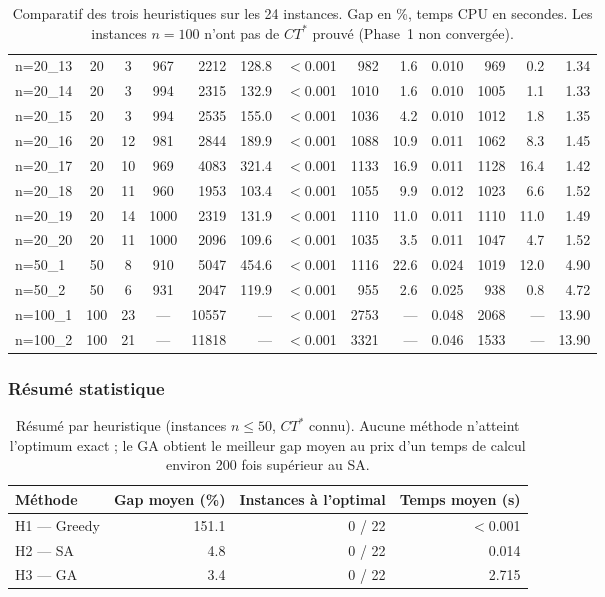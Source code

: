 \documentclass{article}
\begin{document}
\begin{table}[h!]
\begin{tabular}{l c c c | r r r | r r r | r r r}
n=20\_13 & 20 &  3 &  967 & 2212 & 128.8 & $<$0.001 &  982 &  1.6 & 0.010 &  969 &  0.2 & 1.34 \\
n=20\_14 & 20 &  3 &  994 & 2315 & 132.9 & $<$0.001 & 1010 &  1.6 & 0.010 & 1005 &  1.1 & 1.33 \\
n=20\_15 & 20 &  3 &  994 & 2535 & 155.0 & $<$0.001 & 1036 &  4.2 & 0.010 & 1012 &  1.8 & 1.35 \\
n=20\_16 & 20 & 12 &  981 & 2844 & 189.9 & $<$0.001 & 1088 & 10.9 & 0.011 & 1062 &  8.3 & 1.45 \\
n=20\_17 & 20 & 10 &  969 & 4083 & 321.4 & $<$0.001 & 1133 & 16.9 & 0.011 & 1128 & 16.4 & 1.42 \\
n=20\_18 & 20 & 11 &  960 & 1953 & 103.4 & $<$0.001 & 1055 &  9.9 & 0.012 & 1023 &  6.6 & 1.52 \\
n=20\_19 & 20 & 14 & 1000 & 2319 & 131.9 & $<$0.001 & 1110 & 11.0 & 0.011 & 1110 & 11.0 & 1.49 \\
n=20\_20 & 20 & 11 & 1000 & 2096 & 109.6 & $<$0.001 & 1035 &  3.5 & 0.011 & 1047 &  4.7 & 1.52 \\
\midrule
n=50\_1  & 50 &  8 &  910 & 5047 & 454.6 & $<$0.001 & 1116 & 22.6 & 0.024 & 1019 & 12.0 & 4.90 \\
n=50\_2  & 50 &  6 &  931 & 2047 & 119.9 & $<$0.001 &  955 &  2.6 & 0.025 &  938 &  0.8 & 4.72 \\
\midrule
n=100\_1 & 100 & 23 & --- & 10557 & --- & $<$0.001 & 2753 & --- & 0.048 & 2068 & --- & 13.90 \\
n=100\_2 & 100 & 21 & --- & 11818 & --- & $<$0.001 & 3321 & --- & 0.046 & 1533 & --- & 13.90 \\
\bottomrule
\end{tabular}
\caption{Comparatif des trois heuristiques sur les 24 instances. Gap en \%, temps CPU en secondes.
         Les instances $n=100$ n'ont pas de $CT^*$ prouvé (Phase~1 non convergée).}
\label{tab:phase2}
\end{table}

\subsubsection{Résumé statistique}

\begin{table}[h!]
\centering
\begin{tabular}{l r r r}
\toprule
\textbf{Méthode} & \textbf{Gap moyen (\%)} &
\textbf{Instances à l'optimal} & \textbf{Temps moyen (s)} \\
\midrule
H1 --- Greedy & 151.1 & 0 / 22 & $<$0.001 \\
H2 --- SA     &   4.8 & 0 / 22 & 0.014    \\
H3 --- GA     &   3.4 & 0 / 22 & 2.715    \\
\bottomrule
\end{tabular}
\caption{Résumé par heuristique (instances $n \le 50$, $CT^*$ connu). Aucune méthode
n'atteint l'optimum exact ; le GA obtient le meilleur gap moyen au prix d'un temps de
calcul environ 200 fois supérieur au SA.}
\label{tab:phase2_summary}
\end{table}
\end{document}
